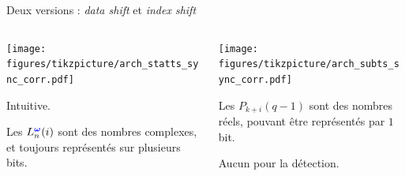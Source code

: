 \documentclass[../main.tex]{subfiles}
\begin{document}
\begin{frame}{Deux versions : \textit{data shift} et \textit{index shift}}{}
  \centering

  \vspace{-1 em}
  \begin{columns}
    \begin{column}{.5\linewidth}
      \begin{overlayarea}{\linewidth}{.9\textheight}
        \centering
        \texttt{[image: figures/tikzpicture/arch\_statts\_sync\_corr.pdf]}

        \begin{ctrlitemize}{0pt}
          \item [\bonus] Intuitive.
          \item [\malus] Les $L^{\textcolor{blue}{\bm{\omega}}}_{n}(i)$ sont des nombres complexes, et toujours représentés sur plusieurs bits.
        \end{ctrlitemize}
      \end{overlayarea}
    \end{column}
    \begin{column}{.5\linewidth}
      \begin{overlayarea}{\linewidth}{.9\textheight}
        \centering
        \texttt{[image: figures/tikzpicture/arch\_subts\_sync\_corr.pdf]}

        \begin{ctrlitemize}{0pt}
          \item [\bonus] Les $P_{k + i}(q - 1)$ sont des nombres réels, pouvant être représentés par $1$ bit.
          \item [\textcolor{RoyalBlue}{\malus}] Aucun pour la détection.
        \end{ctrlitemize}
      \end{overlayarea}
    \end{column}
  \end{columns}
\end{frame}
\end{document}
